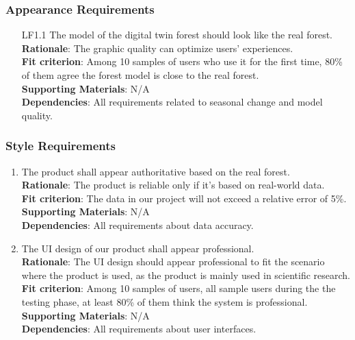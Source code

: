 \documentclass{article}
\begin{document}
\subsubsection{Appearance Requirements}
\begin{enumerate}
\item[LF1.1] The model of the digital twin forest should 
look like the real forest.\\
\textbf{Rationale}: The graphic quality can optimize users'
experiences.\\
\textbf{Fit criterion}: Among 10 samples of users who use it 
for the first time,  80\% of them agree the forest model is
close to the real forest.\\
\textbf{Supporting Materials}: N/A\\
\textbf{Dependencies}: All requirements related to seasonal change and model quality.\\

\end{enumerate}
\subsubsection{Style Requirements}
\begin{enumerate}[LF2.1]
    \item The product shall appear authoritative based on the real forest.\\
    \textbf{Rationale}: The product is reliable only if it's based on real-world data.\\
    \textbf{Fit criterion}: The data in our project will not exceed a relative error of 
    5\%.\\
\textbf{Supporting Materials}: N/A\\
\textbf{Dependencies}: All requirements about data accuracy.\\
    
    \item The UI design of our product shall appear professional.\\
    \textbf{Rationale}: The UI design should appear professional to fit the scenario where the product is used, as the product is mainly used in scientific research.\\
    \textbf{Fit criterion}: Among 10 samples of users, all sample users during the 
    the testing phase, at least 80\% of them think the system is professional.\\
\textbf{Supporting Materials}: N/A\\
\textbf{Dependencies}: All requirements about user interfaces.\\

\end{enumerate}
\end{document}
